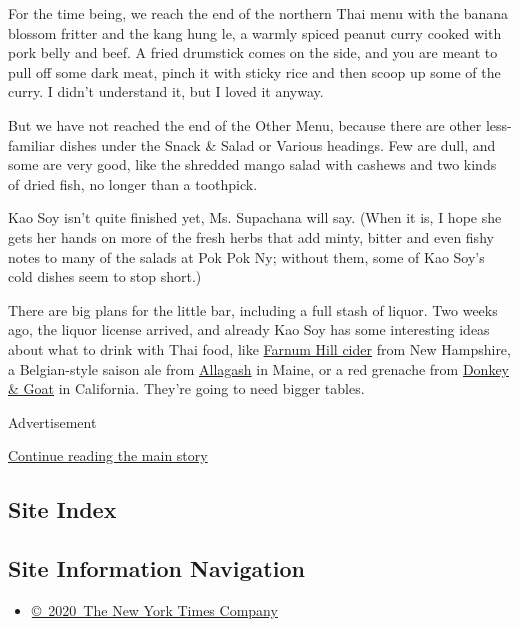 For the time being, we reach the end of the northern Thai menu with the
banana blossom fritter and the kang hung le, a warmly spiced peanut
curry cooked with pork belly and beef. A fried drumstick comes on the
side, and you are meant to pull off some dark meat, pinch it with sticky
rice and then scoop up some of the curry. I didn't understand it, but I
loved it anyway.

But we have not reached the end of the Other Menu, because there are
other less-familiar dishes under the Snack \& Salad or Various headings.
Few are dull, and some are very good, like the shredded mango salad with
cashews and two kinds of dried fish, no longer than a toothpick.

Kao Soy isn't quite finished yet, Ms. Supachana will say. (When it is, I
hope she gets her hands on more of the fresh herbs that add minty,
bitter and even fishy notes to many of the salads at Pok Pok Ny; without
them, some of Kao Soy's cold dishes seem to stop short.)

There are big plans for the little bar, including a full stash of
liquor. Two weeks ago, the liquor license arrived, and already Kao Soy
has some interesting ideas about what to drink with Thai food, like
\href{http://www.povertylaneorchards.com/farnum-hill-ciders/}{Farnum
Hill cider} from New Hampshire, a Belgian-style saison ale from
\href{http://www.allagash.com/distributors/}{Allagash} in Maine, or a
red grenache from \href{http://www.donkeyandgoat.com/}{Donkey \& Goat}
in California. They're going to need bigger tables.

Advertisement

\protect\hyperlink{after-bottom}{Continue reading the main story}

\hypertarget{site-index}{%
\subsection{Site Index}\label{site-index}}

\hypertarget{site-information-navigation}{%
\subsection{Site Information
Navigation}\label{site-information-navigation}}

\begin{itemize}
\tightlist
\item
  \href{https://help.nytimes3xbfgragh.onion/hc/en-us/articles/115014792127-Copyright-notice}{©~2020~The
  New York Times Company}
\end{itemize}

